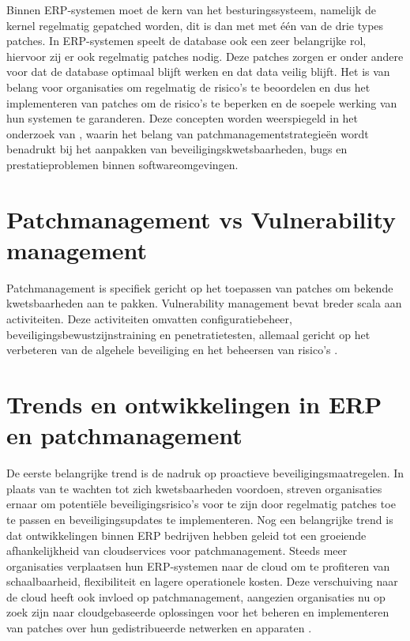 Binnen ERP-systemen moet de kern van het besturingssysteem, namelijk de kernel regelmatig gepatched worden, dit is dan met met één van de drie types patches. In ERP-systemen speelt de database ook een zeer belangrijke rol, hiervoor zij er ook regelmatig patches nodig. Deze patches zorgen er onder andere
voor dat de database optimaal blijft werken en dat data veilig blijft. Het is van belang voor organisaties om regelmatig de risico's te beoordelen en dus het implementeren van patches om de risico's te beperken en de soepele werking van hun systemen te garanderen.
Deze concepten worden weerspiegeld in het onderzoek van \textcite{Wrobel2023}, waarin het belang van patchmanagementstrategieën wordt benadrukt bij het aanpakken van beveiligingskwetsbaarheden, bugs en prestatieproblemen binnen softwareomgevingen.

\section{Patchmanagement vs Vulnerability management}
Patchmanagement is specifiek gericht op het toepassen van patches om bekende kwetsbaarheden aan te pakken. Vulnerability management bevat breder scala aan activiteiten. Deze activiteiten omvatten configuratiebeheer, beveiligingsbewustzijnstraining en penetratietesten, allemaal gericht op het verbeteren van de algehele beveiliging en het beheersen van risico’s \autocite{Danby2023}.


\section{Trends en ontwikkelingen in  ERP en patchmanagement}

De eerste belangrijke trend is de nadruk op proactieve beveiligingsmaatregelen.
In plaats van te wachten tot zich kwetsbaarheden voordoen, streven organisaties ernaar om potentiële beveiligingsrisico's voor te zijn door regelmatig patches toe te passen en beveiligingsupdates te implementeren.
Nog een belangrijke trend is dat ontwikkelingen binnen ERP bedrijven hebben geleid tot een groeiende afhankelijkheid van cloudservices voor patchmanagement.
Steeds meer organisaties verplaatsen hun ERP-systemen naar de cloud om te profiteren van schaalbaarheid, flexibiliteit en lagere operationele kosten.
Deze verschuiving naar de cloud heeft ook invloed op patchmanagement, aangezien organisaties nu op zoek zijn naar cloudgebaseerde oplossingen voor het beheren en implementeren van patches over hun gedistribueerde netwerken en apparaten \autocite{Kannan2023}. 

